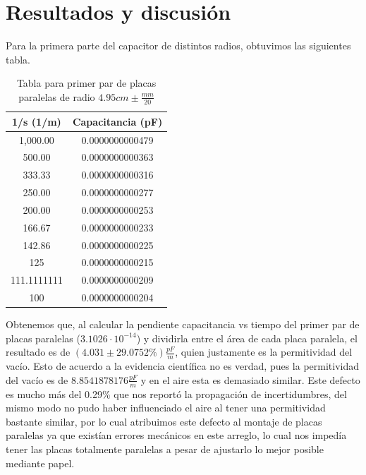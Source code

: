 \documentclass[article,12pt]{elsarticle}
\begin{document}
\section{Resultados y discusión}
Para la primera parte del capacitor de distintos radios, obtuvimos las siguientes tabla.
\begin{table}[H]
\centering
\begin{tabular}{|c|c|}
\hline
\rowcolor[HTML]{C0C0C0} 
\textbf{1/s (1/m)}                 & \textbf{Capacitancia (pF)}              \\ \hline
\rowcolor[HTML]{FFFFFF} 
{\color[HTML]{000000} 1,000.00}    & {\color[HTML]{000000} 0.0000000000479} \\ \hline
\rowcolor[HTML]{FFFFFF} 
{\color[HTML]{000000} 500.00}      & {\color[HTML]{000000} 0.0000000000363} \\ \hline
\rowcolor[HTML]{FFFFFF} 
{\color[HTML]{000000} 333.33}      & {\color[HTML]{000000} 0.0000000000316} \\ \hline
\rowcolor[HTML]{FFFFFF} 
{\color[HTML]{000000} 250.00}      & {\color[HTML]{000000} 0.0000000000277} \\ \hline
\rowcolor[HTML]{FFFFFF} 
{\color[HTML]{000000} 200.00}      & {\color[HTML]{000000} 0.0000000000253} \\ \hline
\rowcolor[HTML]{FFFFFF} 
{\color[HTML]{000000} 166.67}      & {\color[HTML]{000000} 0.0000000000233} \\ \hline
\rowcolor[HTML]{FFFFFF} 
{\color[HTML]{000000} 142.86}      & {\color[HTML]{000000} 0.0000000000225} \\ \hline
\rowcolor[HTML]{FFFFFF} 
{\color[HTML]{000000} 125}         & {\color[HTML]{000000} 0.0000000000215} \\ \hline
\rowcolor[HTML]{FFFFFF} 
{\color[HTML]{000000} 111.1111111} & {\color[HTML]{000000} 0.0000000000209} \\ \hline
\rowcolor[HTML]{FFFFFF} 
{\color[HTML]{000000} 100}         & {\color[HTML]{000000} 0.0000000000204} \\ \hline
\end{tabular}
\caption{Tabla para primer par de placas paralelas de radio $4.95cm \pm \frac{mm}{20}$}
\end{table}
Obtenemos que, al calcular la pendiente capacitancia vs tiempo del primer par de placas paralelas ($3.1026 \cdot 10^{-14}$) y dividirla entre el área de cada placa paralela, el resultado es de $(4.031 \pm 29.0752\%)\frac{pF}{m}$, quien justamente es la permitividad del vacío. Esto de acuerdo a la evidencia científica no es verdad, pues la permitividad del vacío es de $8.8541878176 \frac{pF}{m}$ y en el aire esta es demasiado similar. Este defecto es mucho más del 0.29\% que nos reportó la propagación de incertidumbres, del mismo modo no pudo haber influenciado el aire al tener una permitividad bastante similar, por lo cual atribuimos este defecto al montaje de placas paralelas ya que existían errores mecánicos en este arreglo, lo cual nos impedía tener las placas totalmente paralelas a pesar de ajustarlo lo mejor posible mediante papel.
\end{document}
